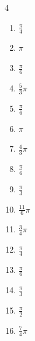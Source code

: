 \begin{multicols}{4}
\begin{enumerate}
  \item $\displaystyle \frac{\pi}{4}$

  \item $\displaystyle \pi$

  \item $\displaystyle \frac{\pi}{6}$

  \item $\displaystyle \frac{5}{3}\pi$

  \item $\displaystyle \frac{\pi}{6}$

  \item $\displaystyle \pi$

  \item $\displaystyle \frac{4}{3}\pi$

  \item $\displaystyle \frac{\pi}{6}$

  \item $\displaystyle \frac{\pi}{3}$

  \item $\displaystyle \frac{11}{6}\pi$

  \item $\displaystyle \frac{3}{4}\pi$

  \item $\displaystyle \frac{\pi}{4}$

  \item $\displaystyle \frac{\pi}{6}$

  \item $\displaystyle \frac{\pi}{3}$

  \item $\displaystyle \frac{\pi}{2}$

\columnbreak %

  \item $\displaystyle \frac{7}{4}\pi$


\end{enumerate}
\end{multicols}
